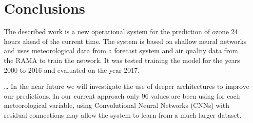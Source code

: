 \section{Conclusions}

The described work is a new operational system for the prediction
of ozone 24 hours ahead of the current time. The system is based
on shallow neural networks and uses meteorological data from a forecast system
and air quality data from the RAMA to train the network. It was tested
training the model for the years 2000 to 2016 and evaluated on the year 2017. 


\ldots
In the near future we will investigate the use of deeper architectures to improve
our predictions. In our current approach only 96 values are been using for each
meteorological variable, using Convolutional Neural Networks (CNNs) with residual 
connections \cite{deep} may allow the system to learn from a much larger dataset. 



